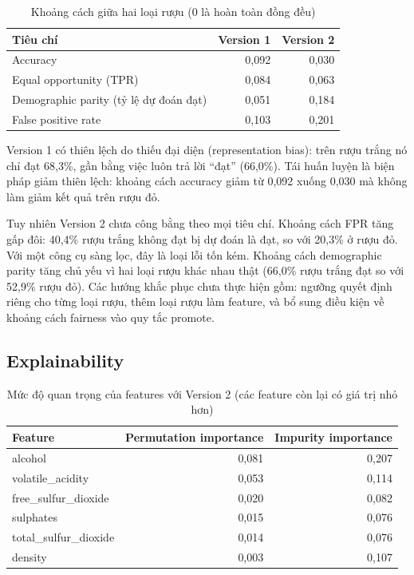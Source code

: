 \documentclass[12pt,a4paper]{report}
\begin{document}
\begin{table}[H]
  \centering
  \caption{Khoảng cách giữa hai loại rượu (0 là hoàn toàn đồng đều)}
  \label{tab:fairness-gap}
  \begin{tabular}{lrr}
    \toprule
    \textbf{Tiêu chí} & \textbf{Version 1} & \textbf{Version 2} \\
    \midrule
    Accuracy                              & 0,092 & 0,030 \\
    Equal opportunity (TPR)               & 0,084 & 0,063 \\
    Demographic parity (tỷ lệ dự đoán đạt) & 0,051 & 0,184 \\
    False positive rate                   & 0,103 & 0,201 \\
    \bottomrule
  \end{tabular}
\end{table}

Version 1 có thiên lệch do thiếu đại diện (representation bias): trên rượu trắng nó chỉ đạt 68,3\%, gần bằng việc luôn trả lời ``đạt'' (66,0\%). Tái huấn luyện là biện pháp giảm thiên lệch: khoảng cách accuracy giảm từ 0,092 xuống 0,030 mà không làm giảm kết quả trên rượu đỏ.

Tuy nhiên Version 2 chưa công bằng theo mọi tiêu chí. Khoảng cách FPR tăng gấp đôi: 40,4\% rượu trắng không đạt bị dự đoán là đạt, so với 20,3\% ở rượu đỏ. Với một công cụ sàng lọc, đây là loại lỗi tốn kém. Khoảng cách demographic parity tăng chủ yếu vì hai loại rượu khác nhau thật (66,0\% rượu trắng đạt so với 52,9\% rượu đỏ). Các hướng khắc phục chưa thực hiện gồm: ngưỡng quyết định riêng cho từng loại rượu, thêm loại rượu làm feature, và bổ sung điều kiện về khoảng cách fairness vào quy tắc promote.

\subsection{Explainability}

\begin{table}[H]
  \centering
  \caption{Mức độ quan trọng của features với Version 2 (các feature còn lại có giá trị nhỏ hơn)}
  \label{tab:importance}
  \begin{tabular}{lrr}
    \toprule
    \textbf{Feature} & \textbf{Permutation importance} & \textbf{Impurity importance} \\
    \midrule
    alcohol                & 0,081 & 0,207 \\
    volatile\_acidity      & 0,053 & 0,114 \\
    free\_sulfur\_dioxide  & 0,020 & 0,082 \\
    sulphates              & 0,015 & 0,076 \\
    total\_sulfur\_dioxide & 0,014 & 0,076 \\
    density                & 0,003 & 0,107 \\
    \bottomrule
  \end{tabular}
\end{table}
\end{document}
